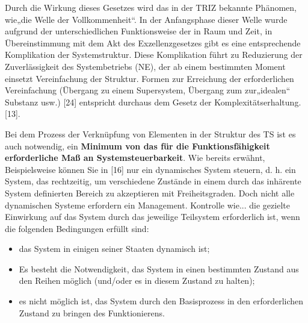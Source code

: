 \documentclass[11pt,a4paper]{article}
\begin{document}
\begin{emph}
  Durch die Wirkung dieses Gesetzes wird das in der TRIZ bekannte Phänomen,
  wie„die Welle der Vollkommenheit“. In der Anfangsphase dieser Welle wurde
  aufgrund der unterschiedlichen Funktionsweise der in Raum und Zeit, in
  Übereinstimmung mit dem Akt des Exzellenzgesetzes gibt es eine entsprechende
  Komplikation der Systemstruktur. Diese Komplikation führt zu Reduzierung der
  Zuverlässigkeit des Systembetriebs (NE), der ab einem bestimmten Moment
  einsetzt Vereinfachung der Struktur. Formen zur Erreichung der
  erforderlichen Vereinfachung (Übergang zu einem Supersystem, Übergang zum
  zur„idealen“ Substanz usw.) [24] entspricht durchaus dem Gesetz der
  Komplexitätserhaltung.  [13].
\end{emph}

Bei dem Prozess der Verknüpfung von Elementen in der Struktur des TS ist es
auch notwendig, ein \textbf{Minimum von das für die Funktionsfähigkeit
  erforderliche Maß an Systemsteuerbarkeit}. Wie bereits erwähnt,
Beispielsweise können Sie in [16] nur ein dynamisches System steuern,
d. h. ein System, das rechtzeitig, um verschiedene Zustände in einem durch das
inhärente System definierten Bereich zu akzeptieren mit Freiheitsgraden. Doch
nicht alle dynamischen Systeme erfordern ein Management. Kontrolle wie...  die
gezielte Einwirkung auf das System durch das jeweilige Teilsystem erforderlich
ist, wenn die folgenden Bedingungen erfüllt sind:
\begin{itemize}
\item das System in einigen seiner Staaten dynamisch ist;
\item Es besteht die Notwendigkeit, das System in einen bestimmten Zustand aus
  den Reihen möglich (und/oder es in diesem Zustand zu halten);
\item es nicht möglich ist, das System durch den Basisprozess in den
  erforderlichen Zustand zu bringen des Funktionierens.
\end{itemize}
\end{document}
